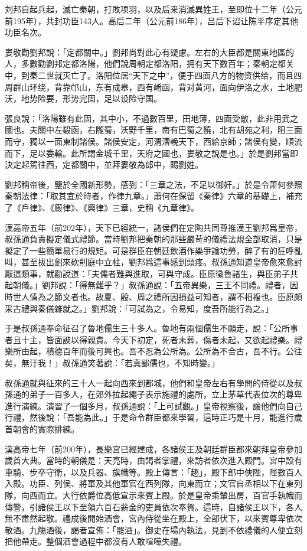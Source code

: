 刘邦自起兵起，滅亡秦朝，打敗项羽，以及后来消滅異姓王，至即位十二年（公元前195年），共封功臣143人。高后二年（公元前186年），吕后下诏让陈平序定其他功臣名次。

婁敬勸劉邦說：「定都關中。」劉邦尚對此心有疑慮。左右的大臣都是關東地區的人，多數勸劉邦定都洛陽，他們說周朝定都洛阳，拥有天下数百年；秦朝定都关中，到秦二世就灭亡了。洛阳位居“天下之中”，便于四面八方的物资供给，而且四周群山环绕，背靠邙山，东有成皋，西有崤函，背对黄河，面向伊洛之水，土地肥沃，地势险要，形势完固，足以设险守国。

張良說：「洛陽雖有此固，其中小，不過數百里，田地薄，四面受敵，此非用武之國也。夫關中左殽函，右隴蜀，沃野千里，南有巴蜀之饒，北有胡苑之利，阻三面而守，獨以一面東制諸侯。諸侯安定，河渭漕輓天下，西給京師；諸侯有變，順流而下，足以委輸。此所謂金城千里，天府之國也，婁敬之說是也。」於是劉邦當即決定起駕往西，定都關中，並拜婁敬為郎中，賜劉姓。

劉邦稱帝後，鑒於全國新形勢，感到：「三章之法，不足以御奸。」於是令萧何參照秦朝法律：「取其宜於時者，作律九章。」蕭何在保留《秦律》六章的基礎上，補充了《戶律》、《廄律》、《興律》三章，史稱《九章律》。

漢高帝五年（前202年），天下已經統一，諸侯們在定陶共同尊推漢王劉邦爲皇帝，叔孫通負責擬定儀式禮節。當時劉邦把秦朝的那些嚴苛的儀禮法規全部取消，只是擬定了一些簡單易行的規矩。可是群臣在朝廷飲酒作樂爭論功勞，醉了有的狂呼亂叫，甚至拔出劍來砍削庭中立柱，劉邦爲這事感到頭疼。叔孫通知道皇帝愈來愈討厭這類事，就勸說道：「夫儒者難與進取，可與守成。臣原徵魯諸生，與臣弟子共起朝儀。」劉邦說：「得無難乎？」叔孫通說：「五帝異樂，三王不同禮。禮者，因時世人情為之節文者也。故夏、殷、周之禮所因損益可知者，謂不相複也。臣原頗采古禮與秦儀雜就之。」劉邦說：「可試為之，令易知，度吾所能行為之。」

于是叔孫通奉命征召了魯地儒生三十多人。魯地有兩個儒生不願走，說：「公所事者且十主，皆面諛以得親貴。今天下初定，死者未葬，傷者未起，又欲起禮樂。禮樂所由起，積德百年而後可興也。吾不忍為公所為。公所為不合古，吾不行。公往矣，無汙我！」叔孫通笑著說：「若真鄙儒也，不知時變。」

叔孫通就與征來的三十人一起向西來到都城，他們和皇帝左右有學問的侍從以及叔孫通的弟子一百多人，在郊外拉起繩子表示施禮的處所，立上茅草代表位次的尊卑進行演練。演習了一個多月，叔孫通說：「上可試觀。」皇帝視察後，讓他們向自己行禮，然後說：「吾能為此。」于是命令群臣都來學習，這時正巧是十月，能進行歲首朝會的實際排練。

漢高帝七年（前200年），長樂宮已經建成，各諸侯王及朝廷群臣都來朝拜皇帝參加歲首大典。當時的朝儀是：天亮時，由謁者掌禮，來訪者依次進入殿門。宮中設有車騎、步卒守衛，以及兵器、旗幟等。殿上傳言：「趨」，殿下郎中俠陛，陛數百人入殿。功臣、列侯、將軍及其他軍官在西列隊，向東而立；文官自丞相以下在東列隊，向西而立。大行依爵位高低宣示來賓上殿。於是皇帝乘輦出房，百官手執幟而傳警，引諸侯王以下至領六百石薪金的吏員依次奉賀。這時，自諸侯王以下，各人無不肅然起敬。禮成後開始酒會，宮內侍從坐在殿上，全部伏下，以來賓尊卑依次敬酒。九觴酒後，謁者宣佈：「罷酒」。御史在場內執法，見到不依禮儀的人便立刻把他帶走。整個酒會過程中都沒有人敢喧嘩失禮。

